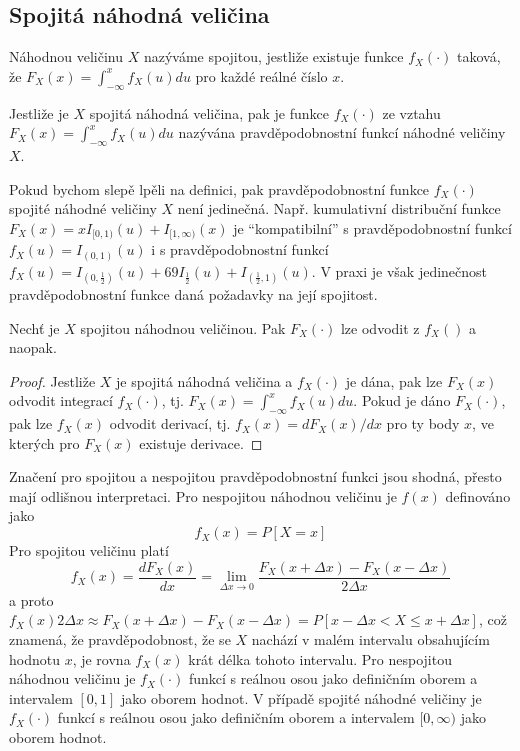 \subsection{Spojitá náhodná veličina}

\begin{definition}
Náhodnou veličinu $X$ nazýváme spojitou, jestliže existuje funkce $f_X(\cdot)$ taková, že $F_X(x) = \int_{-\infty}^x f_X(u)du$ pro každé reálné číslo $x$. 
\end{definition}

\begin{definition}
Jestliže je $X$ spojitá náhodná veličina, pak je funkce $f_X(\cdot)$ ze vztahu $F_X(x) = \int_{-\infty}^xf_X(u)du$ nazývána pravděpodobnostní funkcí náhodné veličiny $X$.
\end{definition}

Pokud bychom slepě lpěli na definici, pak pravděpodobnostní funkce $f_X(\cdot)$ spojité náhodné veličiny $X$ není jedinečná. Např. kumulativní distribuční funkce $F_X(x) = xI_{[0,1)}(u)+I_{[1, \infty)}(x)$ je ``kompatibilní'' s pravděpodobnostní funkcí $f_X(u) = I_{(0,1)}(u)$ i s pravděpodobnostní funkcí $f_X(u) = I_{(0, \frac{1}{2})}(u)+69I_{\frac{1}{2}}(u) + I_{(\frac{1}{2}, 1)}(u)$. V praxi je však jedinečnost pravděpodobnostní funkce daná požadavky na její spojitost.

\begin{theorem}
Nechť je $X$ spojitou náhodnou veličinou. Pak $F_X(\cdot)$ lze odvodit z $f_X()$ a naopak.
\end{theorem}

\begin{proof}
Jestliže $X$ je spojitá náhodná veličina a $f_X(\cdot)$ je dána, pak lze $F_X(x)$ odvodit integrací $f_X(\cdot)$, tj. $F_X(x) = \int_{-\infty}^x f_X(u)du$. Pokud je dáno $F_X(\cdot)$, pak lze $f_X(x)$ odvodit derivací, tj. $f_X(x) = dF_X(x)/dx$ pro ty body $x$, ve kterých pro $F_X(x)$ existuje derivace.
\end{proof}

Značení pro spojitou a nespojitou pravděpodobnostní funkci jsou shodná, přesto mají odlišnou interpretaci. Pro nespojitou náhodnou veličinu je $f(x)$ definováno jako
\begin{equation*}
f_X(x) = P[X = x]
\end{equation*}
Pro spojitou veličinu platí
\begin{equation*}
f_X(x) = \frac{d F_X(x)}{dx} = \lim_{\Delta x \rightarrow 0} \frac{F_X(x + \Delta x) - F_X(x - \Delta x)}{2 \Delta x}
\end{equation*}
a proto $f_X(x)2 \Delta x \approx F_X(x + \Delta x) - F_X(x - \Delta x) = P[x - \Delta x < X \le x + \Delta x]$, což znamená, že pravděpodobnost, že se $X$ nachází v malém intervalu obsahujícím hodnotu $x$, je rovna $f_X(x)$ krát délka tohoto intervalu. Pro nespojitou náhodnou veličinu je $f_X(\cdot)$ funkcí s reálnou osou jako definičním oborem a intervalem $[0, 1]$ jako oborem hodnot. V případě spojité náhodné veličiny je $f_X(\cdot)$ funkcí s reálnou osou jako definičním oborem a intervalem $[0, \infty)$ jako oborem hodnot.

